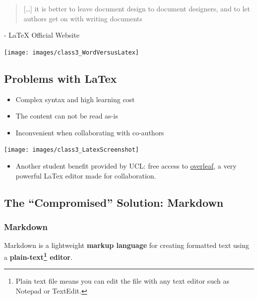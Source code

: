 \documentclass[
  11pt,
]{book}
\providecommand{\tightlist}{%
  \setlength{\itemsep}{0pt}\setlength{\parskip}{0pt}}
\begin{document}
\begin{quote}
{[}\ldots{]} it is better to leave document design to document designers, and to let authors get on with writing documents
\end{quote}

\hfill - LaTeX Official Website

\begin{center}\texttt{[image: images/class3\_WordVersusLatex]} \end{center}

\hypertarget{problems-with-latex}{%
\subsection{Problems with LaTex}\label{problems-with-latex}}

\begin{itemize}
\tightlist
\item
  Complex syntax and high learning cost
\item
  The content can not be read as-is
\item
  Inconvenient when collaborating with co-authors
\end{itemize}

\begin{center}\texttt{[image: images/class3\_LatexScreenshot]} \end{center}

\begin{itemize}
\tightlist
\item
  Another student benefit provided by UCL: free access to \href{https://www.overleaf.com/edu/ucl}{overleaf}, a very powerful LaTex editor made for collaboration.
\end{itemize}

\hypertarget{the-compromised-solution-markdown}{%
\subsection{The ``Compromised'' Solution: Markdown}\label{the-compromised-solution-markdown}}

\hypertarget{markdown-1}{%
\subsubsection{Markdown}\label{markdown-1}}

Markdown is a lightweight \textbf{markup language} for creating formatted text using a \textbf{plain-text\footnote{Plain text file means you can edit the file with any text editor such as Notepad or TextEdit.} editor}.
\end{document}
